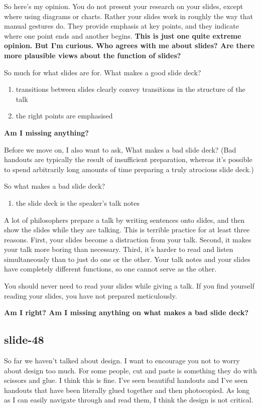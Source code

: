 \documentclass[12pt,\papersize]{extarticle}
\begin{document}
So here's my opinion.
You do not present your research on your slides, except where using diagrams or charts.
Rather your slides work in roughly the way that manual gestures do.
They provide emphasis at key points, and they indicate where one point ends and another begins.
\textbf{This is just one quite extreme opinion.  But I'm curious.  Who agrees with me about slides?  Are there more plausible views about the function of slides?}
 
So much for what slides are for.
What makes a good slide deck?
\begin{enumerate}
\item transitions between slides clearly convey transitions in the structure of the talk
\item the right points are emphasised
\end{enumerate}
\textbf{Am I missing anything?}
 
Before we move on, I also want to ask, What makes a bad slide deck?
(Bad handouts are typically the result of insufficient preparation, whereas it's possible to spend
arbitrarily long amounts of time preparing a truly atrocious slide deck.)
 
So what makes a bad slide deck?
\begin{enumerate}
\item the slide deck is the speaker's talk notes
\end{enumerate}
A lot of philosophers prepare a talk by writing sentences onto slides, and then show the slides
while they are talking.
This is terrible practice for at least three reasons.
First, your slides become a distraction from your talk.
Second, it makes your talk more boring than necessary.
Third, it's harder to read and listen simultaneously than to just do one or the other.
Your talk notes and your slides have completely different functions, so one cannot serve as the other.

You should never need to read your slides while giving a talk.
If you find yourself reading your slides, you have not prepared meticulously.

\textbf{Am I right?  Am I missing anything on what makes a bad slide deck?}
 
\subsection{slide-48}
So far we haven't talked about design.  
I want to encourage you not to worry about design too much.
For some people, cut and paste is something they do with scissors and glue.
I think this is fine.
I've seen beautiful handouts and I've seen handouts that have been literally glued together and
then photocopied.  As long as I can easily navigate through and read them, I think the design is not 
critical.
 
\end{document}

